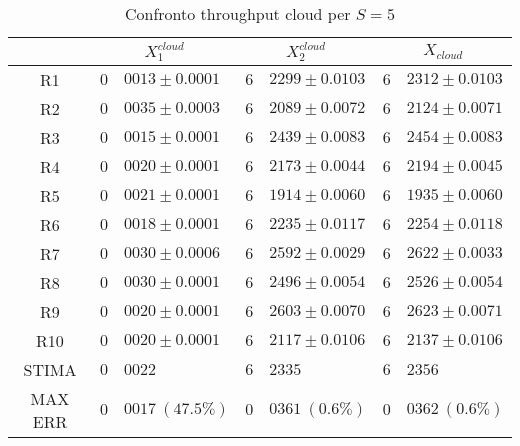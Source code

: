 \begin{table}[!h]
\begin{tabular}{c|r@{.}l|r@{.}l|r@{.}l}
& \multicolumn{2}{|c|}{$X_1^{cloud}$}
& \multicolumn{2}{|c|}{$X_2^{cloud}$}
& \multicolumn{2}{|c}{$X_{cloud}$} 
\\          
\hline
R1      & $0$&$0013 \pm 0.0001$ & $6$&$2299 \pm 0.0103$ & $6$&$2312 \pm 0.0103$ \\
R2      & $0$&$0035 \pm 0.0003$ & $6$&$2089 \pm 0.0072$ & $6$&$2124 \pm 0.0071$ \\
R3      & $0$&$0015 \pm 0.0001$ & $6$&$2439 \pm 0.0083$ & $6$&$2454 \pm 0.0083$ \\
R4      & $0$&$0020 \pm 0.0001$ & $6$&$2173 \pm 0.0044$ & $6$&$2194 \pm 0.0045$ \\
R5      & $0$&$0021 \pm 0.0001$ & $6$&$1914 \pm 0.0060$ & $6$&$1935 \pm 0.0060$ \\
R6      & $0$&$0018 \pm 0.0001$ & $6$&$2235 \pm 0.0117$ & $6$&$2254 \pm 0.0118$ \\
R7      & $0$&$0030 \pm 0.0006$ & $6$&$2592 \pm 0.0029$ & $6$&$2622 \pm 0.0033$ \\
R8      & $0$&$0030 \pm 0.0001$ & $6$&$2496 \pm 0.0054$ & $6$&$2526 \pm 0.0054$ \\
R9      & $0$&$0020 \pm 0.0001$ & $6$&$2603 \pm 0.0070$ & $6$&$2623 \pm 0.0071$ \\
R10     & $0$&$0020 \pm 0.0001$ & $6$&$2117 \pm 0.0106$ & $6$&$2137 \pm 0.0106$ \\
STIMA   & $0$&$0022$            & $6$&$2335$            & $6$&$2356$            \\
MAX ERR & $0$&$0017 \ (47.5\%)$ & $0$&$0361 \ (0.6\%)$  & $0$&$0362 \ (0.6\%)$    
\end{tabular}
\centering
\caption{Confronto throughput cloud per $S=5$}
\label{tab:5_xcloud}
\end{table}
